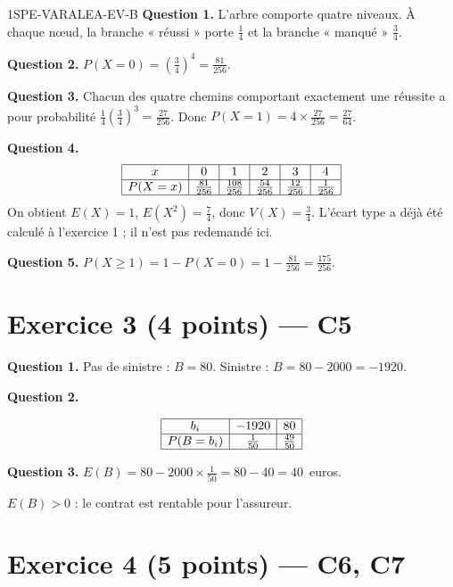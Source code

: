 \begin{corrige}{1SPE-VARALEA-EV-B}
\textbf{Question 1.} L'arbre comporte quatre niveaux. À chaque nœud, la branche « réussi » porte $\frac14$ et la branche « manqué » $\frac34$.

\medskip
\textbf{Question 2.} $P(X=0)=\left(\frac34\right)^4=\frac{81}{256}$.

\medskip
\textbf{Question 3.} Chacun des quatre chemins comportant exactement une réussite a pour probabilité $\frac14\left(\frac34\right)^3=\frac{27}{256}$. Donc $P(X=1)=4\times\frac{27}{256}=\frac{27}{64}$.

\medskip
\textbf{Question 4.}
\[
\begin{array}{|c|c|c|c|c|c|}\hline
x&0&1&2&3&4\\ \hline
P(X=x)&\frac{81}{256}&\frac{108}{256}&\frac{54}{256}&\frac{12}{256}&\frac1{256}\\ \hline
\end{array}
\]
On obtient $E(X)=1$, $E(X^2)=\frac74$, donc $V(X)=\frac34$.
L'écart type a déjà été calculé à l'exercice 1 ; il n'est pas redemandé ici.

\medskip
\textbf{Question 5.} $P(X\geq1)=1-P(X=0)=1-\frac{81}{256}=\frac{175}{256}$.

\section*{Exercice 3 \hfill (4 points) — C5}


\textbf{Question 1.} Pas de sinistre : $B = 80$. Sinistre : $B = 80 - 2000 = -1920$.

\medskip
\textbf{Question 2.}

\[
\begin{array}{|c|c|c|}
\hline
b_i & -1920 & 80 \\
\hline
P(B=b_i) & \frac{1}{50} & \frac{49}{50} \\
\hline
\end{array}
\]

\medskip
\textbf{Question 3.} $E(B) = 80 - 2000 \times \frac{1}{50} = 80 - 40 = 40$~euros.

$E(B) > 0$ : le contrat est rentable pour l'assureur.

\section*{Exercice 4 \hfill (5 points) — C6, C7}


\end{corrige}

